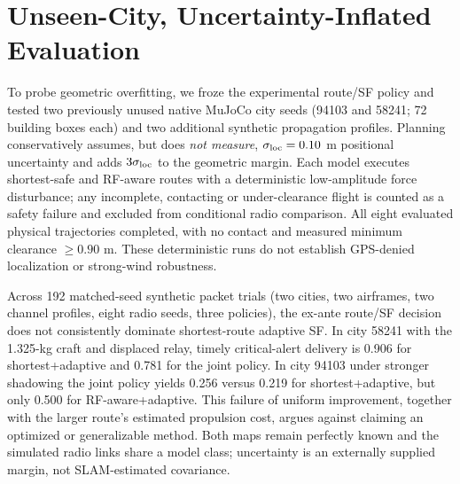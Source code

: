 \documentclass[conference]{IEEEtran}
\begin{document}
\section{Unseen-City, Uncertainty-Inflated Evaluation}
To probe geometric overfitting, we froze the experimental route/SF policy and tested two previously unused native MuJoCo city seeds (94103 and 58241; 72 building boxes each) and two additional synthetic propagation profiles. Planning conservatively assumes, but does \emph{not measure}, $\sigma_{\rm loc}=0.10$ m positional uncertainty and adds $3\sigma_{\rm loc}$ to the geometric margin. Each model executes shortest-safe and RF-aware routes with a deterministic low-amplitude force disturbance; any incomplete, contacting or under-clearance flight is counted as a safety failure and excluded from conditional radio comparison. All eight evaluated physical trajectories completed, with no contact and measured minimum clearance $\geq0.90$ m. These deterministic runs do not establish GPS-denied localization or strong-wind robustness.

Across 192 matched-seed synthetic packet trials (two cities, two airframes, two channel profiles, eight radio seeds, three policies), the ex-ante route/SF decision does not consistently dominate shortest-route adaptive SF. In city 58241 with the 1.325-kg craft and displaced relay, timely critical-alert delivery is 0.906 for shortest+adaptive and 0.781 for the joint policy. In city 94103 under stronger shadowing the joint policy yields 0.256 versus 0.219 for shortest+adaptive, but only 0.500 for RF-aware+adaptive. This failure of uniform improvement, together with the larger route's estimated propulsion cost, argues against claiming an optimized or generalizable method. Both maps remain perfectly known and the simulated radio links share a model class; uncertainty is an externally supplied margin, not SLAM-estimated covariance.
\end{document}

